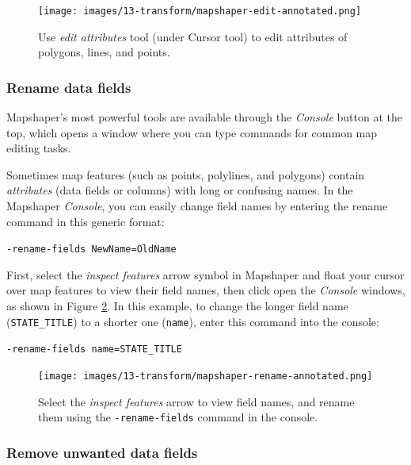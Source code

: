 \documentclass[
  english,
]{book}
\begin{document}
\begin{figure}
\centering
\texttt{[image: images/13-transform/mapshaper-edit-annotated.png]}
\caption{\label{fig:mapshaper-edit}Use \emph{edit attributes} tool (under Cursor tool) to edit attributes of polygons, lines, and points.}
\end{figure}

\hypertarget{rename-data-fields}{%
\subsubsection*{Rename data fields}\label{rename-data-fields}}

Mapshaper's most powerful tools are available through the \emph{Console} button at the top, which opens a window where you can type commands for common map editing tasks.

Sometimes map features (such as points, polylines, and polygons) contain \emph{attributes} (data fields or columns) with long or confusing names. In the Mapshaper \emph{Console}, you can easily change field names by entering the rename command in this generic format:

\texttt{-rename-fields\ NewName=OldName}

First, select the \emph{inspect features} arrow symbol in Mapshaper and float your cursor over map features to view their field names, then click open the \emph{Console} windows, as shown in Figure \ref{fig:mapshaper-rename}. In this example, to change the longer field name (\texttt{STATE\_TITLE}) to a shorter one (\texttt{name}), enter this command into the console:

\texttt{-rename-fields\ name=STATE\_TITLE}



\begin{figure}
\centering
\texttt{[image: images/13-transform/mapshaper-rename-annotated.png]}
\caption{\label{fig:mapshaper-rename}Select the \emph{inspect features} arrow to view field names, and rename them using the \texttt{-rename-fields} command in the console.}
\end{figure}

\hypertarget{remove-unwanted-data-fields}{%
\subsubsection*{Remove unwanted data fields}\label{remove-unwanted-data-fields}}
\end{document}
